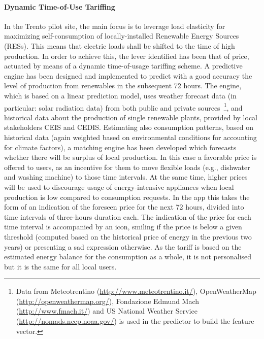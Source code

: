 \paragraph{Dynamic Time-of-Use Tariffing}
In the Trento pilot site, the main focus is to leverage load elasticity for maximizing self-consumption of locally-installed Renewable Energy Sources (RESs). This means that electric loads shall be shifted to the time of high production. In order to achieve this, the lever identified has been that of price, actuated by means of a dynamic time-of-usage tariffing scheme. 
A predictive engine has been designed and implemented to predict with a good accuracy the level of production from renewables in the subsequent 72 hours. The engine, which is based on a linear prediction model, uses weather forecast data (in particular: solar radiation data) from both public and private sources~\footnote{Data from Meteotrentino (\url{http://www.meteotrentino.it/}), OpenWeatherMap (\url{http://openweathermap.org/}), Fondazione Edmund Mach (\url{http://www.fmach.it/}) and US National Weather Service (\url{http://nomads.ncep.noaa.gov/}) is used in the predictor to build the feature vector.}, and historical data about the production of single renewable plants, provided by local stakeholders CEIS and CEDIS.
Estimating also consumption patterns, based on historical data (again weighted based on environmental conditions for accounting for climate factors), a matching engine has been developed which forecasts whether there will be surplus of local production. In this case a favorable price is offered to users, as an incentive for them to move flexible loads (e.g., dishwater and washing machine) to those time intervals. At the same time, higher prices will be used to discourage usage of energy-intensive appliances when local production is low compared to consumption requests. In the app this takes the form of an indication of the foreseen price for the next 72 hours, divided into time intervals of three-hours duration each. The indication of the price for each time interval is accompanied by an icon, smiling if the price is below a given threshold (computed based on the historical price of energy in the previous two years) or presenting a sad expression otherwise. As the tariff is based on the estimated energy balance for the consumption as a whole, it is not personalised but it is the same for all local users.


